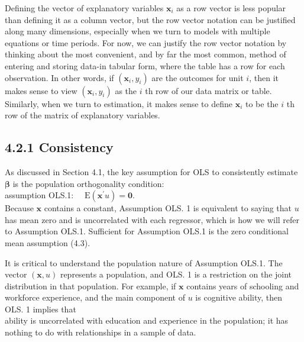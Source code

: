 \documentclass[10pt]{article}
\begin{document}
Defining the vector of explanatory variables $\mathbf{x}_{i}$ as a row vector is less popular than defining it as a column vector, but the row vector notation can be justified along many dimensions, especially when we turn to models with multiple equations or time periods. For now, we can justify the row vector notation by thinking about the most convenient, and by far the most common, method of entering and storing data-in tabular form, where the table has a row for each observation. In other words, if $\left(\mathbf{x}_{i}, y_{i}\right)$ are the outcomes for unit $i$, then it makes sense to view $\left(\mathbf{x}_{i}, y_{i}\right)$ as the $i$ th row of our data matrix or table. Similarly, when we turn to estimation, it makes sense to define $\mathbf{x}_{i}$ to be the $i$ th row of the matrix of explanatory variables.

\subsection*{4.2.1 Consistency}
As discussed in Section 4.1, the key assumption for OLS to consistently estimate $\boldsymbol{\beta}$ is the population orthogonality condition:\\
assumption OLS.1: $\quad \mathrm{E}\left(\mathbf{x}^{\prime} u\right)=\mathbf{0}$.\\
Because $\mathbf{x}$ contains a constant, Assumption OLS. 1 is equivalent to saying that $u$ has mean zero and is uncorrelated with each regressor, which is how we will refer to Assumption OLS.1. Sufficient for Assumption OLS.1 is the zero conditional mean assumption (4.3).

It is critical to understand the population nature of Assumption OLS.1. The vector $(\mathbf{x}, u)$ represents a population, and OLS. 1 is a restriction on the joint distribution in that population. For example, if $\mathbf{x}$ contains years of schooling and workforce experience, and the main component of $u$ is cognitive ability, then OLS. 1 implies that\\
ability is uncorrelated with education and experience in the population; it has nothing to do with relationships in a sample of data.
\end{document}
